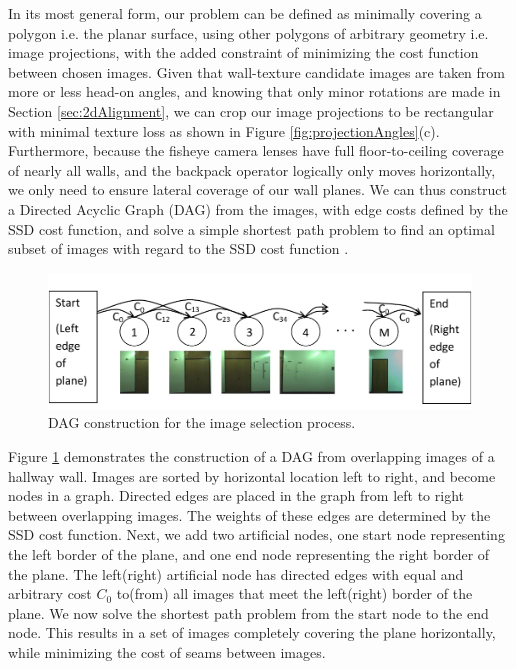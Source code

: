 \documentclass[]{spie}  %
\begin{document}
In its most general form, our problem can be defined as minimally
covering a polygon i.e. the planar surface, using other polygons of
arbitrary geometry i.e. image projections, with the added constraint
of minimizing the cost function between chosen images. Given that
wall-texture candidate images are taken from more or less head-on
angles, and knowing that only minor rotations are made in Section
\ref{sec:2dAlignment}, we can crop our image projections to be
rectangular with minimal texture loss as shown in Figure
\ref{fig:projectionAngles}(c). Furthermore, because the fisheye camera
lenses have full floor-to-ceiling coverage of nearly all walls, and
the backpack operator logically only moves horizontally, we only need
to ensure lateral coverage of our wall planes. We can thus construct a
Directed Acyclic Graph (DAG) from the images, with edge costs defined
by the SSD cost function, and solve a simple shortest path problem to
find an optimal subset of images with regard to the SSD cost function
\cite{dijkstra}.

\begin{figure}
  \centering
  \includegraphics[width=5in]{dagCreation.pdf}
  \caption{DAG construction for the image selection process. \\}
  \label{fig:dagCreation}
\end{figure}

Figure \ref{fig:dagCreation} demonstrates the construction of a DAG
from overlapping images of a hallway wall. Images are sorted by
horizontal location left to right, and become nodes in a
graph. Directed edges are placed in the graph from left to right
between overlapping images. The weights of these edges are determined
by the SSD cost function. Next, we add two artificial nodes, one start
node representing the left border of the plane, and one end node
representing the right border of the plane. The left(right) artificial
node has directed edges with equal and arbitrary cost $C_0$ to(from)
all images that meet the left(right) border of the plane. We now solve
the shortest path problem from the start node to the end node. This
results in a set of images completely covering the plane horizontally,
while minimizing the cost of seams between images.
\end{document}
